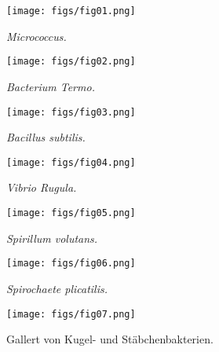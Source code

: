 \documentclass[a4paper, 11pt, oneside, english]{article}
\begin{document}
\begin{figure}[H]
\centering
\texttt{[image: figs/fig01.png]}
\caption{\emph{Micrococcus.}}
\end{figure}

\begin{figure}[H]
\centering
\texttt{[image: figs/fig02.png]}
\caption{\emph{Bacterium Termo.}}
\end{figure}

\begin{figure}[H]
\centering
\texttt{[image: figs/fig03.png]}
\caption{\emph{Bacillus subtilis.}}
\end{figure}

\begin{figure}[H]
\centering
\texttt{[image: figs/fig04.png]}
\caption{\emph{Vibrio Rugula.}}
\end{figure}

\begin{figure}[H]
\centering
\texttt{[image: figs/fig05.png]}
\caption{\emph{Spirillum volutans.}}
\end{figure}

\begin{figure}[H]
\centering
\texttt{[image: figs/fig06.png]}
\caption{\emph{Spirochaete plicatilis.}}
\end{figure}

\begin{figure}[H]
\centering
\texttt{[image: figs/fig07.png]}
\caption{Gallert von Kugel- und Stäbchenbakterien.}
\end{figure}
\end{document}
